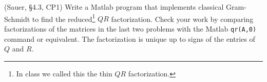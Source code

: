 \documentclass[12pt,fleqn]{exam}
\begin{document}
\begin{questions}
\question (Sauer, \S4.3, CP1) Write a Matlab program that implements classical Gram-Schmidt to find the reduced\footnote{In class we called this the thin $QR$ factorization.} $QR$ factorization. Check your work by comparing factorizations of the matrices in the last two problems with the Matlab \verb$qr(A,0)$ command or equivalent. The factorization is unique up to signs of the entries of $Q$ and $R$.
\end{questions}
\end{document}
